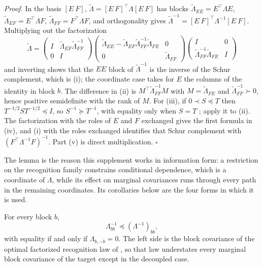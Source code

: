 \noindent\emph{Proof.}
In the basis \([E\ F]\), \(\widetilde\Lambda=[E\ F]^\top\Lambda[E\ F]\) has
blocks \(\widetilde\Lambda_{EE}=E^\top\Lambda E\),
\(\widetilde\Lambda_{EF}=E^\top\Lambda F\), \(\widetilde\Lambda_{FF}=F^\top\Lambda F\),
and orthogonality gives \(\widetilde\Lambda^{-1}=[E\ F]^\top\Lambda^{-1}[E\ F]\).
Multiplying out the factorization
\[
\widetilde\Lambda
=\begin{pmatrix}I&\widetilde\Lambda_{EF}\widetilde\Lambda_{FF}^{-1}\\0&I\end{pmatrix}
\begin{pmatrix}\widetilde\Lambda_{EE}-\widetilde\Lambda_{EF}\widetilde\Lambda_{FF}^{-1}\widetilde\Lambda_{FE}&0\\0&\widetilde\Lambda_{FF}\end{pmatrix}
\begin{pmatrix}I&0\\\widetilde\Lambda_{FF}^{-1}\widetilde\Lambda_{FE}&I\end{pmatrix}
\]
and inverting shows that the \(EE\) block of \(\widetilde\Lambda^{-1}\) is the
inverse of the Schur complement, which is (i); the coordinate case takes for
\(E\) the columns of the identity in block \(b\). The difference in (ii) is
\(M^\top\widetilde\Lambda_{FF}^{-1}M\) with \(M=\widetilde\Lambda_{FE}\) and
\(\widetilde\Lambda_{FF}^{-1}\succ0\), hence positive semidefinite with the
rank of \(M\). For (iii), if \(0\prec S\preceq T\) then
\(T^{-1/2}ST^{-1/2}\preceq I\), so \(S^{-1}\succeq T^{-1}\), with equality only
when \(S=T\) \citep[\S7.7]{HornJohnson2013}; apply it to (ii). The
factorization with the roles of \(E\) and \(F\) exchanged gives the first
formula in (iv), and (i) with the roles exchanged identifies that Schur
complement with \((F^\top\Lambda^{-1}F)^{-1}\). Part (v) is direct
multiplication. \(\square\)

The lemma is the reason this supplement works in information form: a
restriction on the recognition family constrains conditional dependence, which
is a coordinate of \(\Lambda\), while its effect on marginal covariances runs
through every path in the remaining coordinates. Its corollaries below are the
four forms in which it is used.

For every block \(b\),
\begin{equation}
\Lambda_{bb}^{-1}\preceq\left(\Lambda^{-1}\right)_{bb},
\label{eq:restrict-underdispersion}
\end{equation}
with equality if and only if \(\Lambda_{b,-b}=0\). The left side is the block
covariance of the optimal factorized recognition law of
, so that law understates every
marginal block covariance of the target except in the decoupled case.

